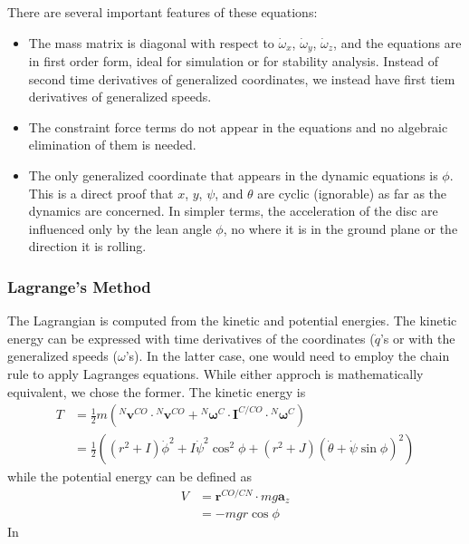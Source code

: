 \documentclass[letterpaper,11pt]{article}
\newcommand{\bs}[1]{\boldsymbol{#1}}
\begin{document}
There are several important features of these equations:
\begin{itemize}

    \item The mass matrix is diagonal with respect to $\dot{\omega}_x$,
        $\dot{\omega}_y$, $\dot{\omega}_z$, and the equations are in first
        order form, ideal for simulation or for stability analysis.  Instead of
        second time derivatives of generalized coordinates, we instead have
        first tiem derivatives of generalized speeds.

    \item The constraint force terms do not appear in the equations and no
        algebraic elimination of them is needed.

    \item The only generalized coordinate that appears in the dynamic
        equations is $\phi$. This is a direct proof that $x$, $y$,
        $\psi$, and $\theta$ are cyclic (ignorable) as far as the dynamics are
        concerned.  In simpler terms, the acceleration of the disc are
        influenced only by the lean angle $\phi$, no where it is in the ground
        plane or the direction it is rolling.
\end{itemize}


\subsubsection{Lagrange's Method}

The Lagrangian is computed from the kinetic and potential energies.  The
kinetic energy can be expressed with time derivatives of the coordinates
($\dot{q}$'s or with the generalized speeds ($\omega$'s).  In the latter case,
one would need to employ the chain rule to apply Lagranges equations.  While
either approch is mathematically equivalent, we chose the former.  The kinetic
energy is
\begin{align}
    T &=  \frac{1}{2}m ({}^N\bs{v}^{CO} \cdot {}^N\bs{v}^{CO} + {}^N\bs{\omega}^C
    \cdot \bs{I}^{C/CO} \cdot {}^N\bs{\omega}^C) \nonumber \\
    &= \frac{1}{2}\left( (r^2 + I) \dot{\phi}^2 + I\dot{\psi}^2\cos^2{\phi}
      + (r^2 + J)(\dot{\theta}+\dot{\psi}\sin{\phi})^2 \right)
    \label{eq:ke}
\end{align}
while the potential energy can be defined as
\begin{align}
    V &= \bs{r}^{CO/CN} \cdot mg\bs{a}_z\nonumber \\
      &= -mgr\cos{\phi}
    \label{eq:pe}
\end{align}
In 
\end{document}
